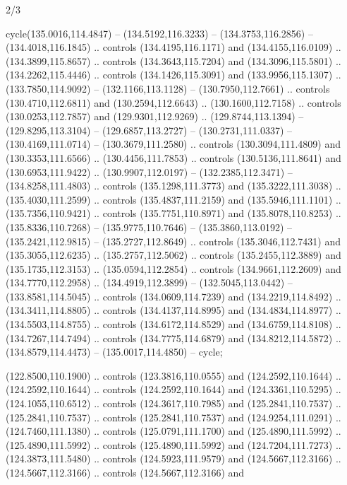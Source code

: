 \begin{flagdescription}{2/3}
\begin{scope}[scale=0.00214\flagwidth,yshift=164.5mm]
\begin{scope}[y=-0.8pt, x=0.8pt, inner sep=0pt, outer sep=0pt]
\begin{scope}[fill=black]
  cycle(135.0016,114.4847) -- (134.5192,116.3233) -- (134.3753,116.2856) --
  (134.4018,116.1845) .. controls (134.4195,116.1171) and (134.4155,116.0109) ..
  (134.3899,115.8657) .. controls (134.3643,115.7204) and (134.3096,115.5801) ..
  (134.2262,115.4446) .. controls (134.1426,115.3091) and (133.9956,115.1307) ..
  (133.7850,114.9092) -- (132.1166,113.1128) -- (130.7950,112.7661) .. controls
  (130.4710,112.6811) and (130.2594,112.6643) .. (130.1600,112.7158) .. controls
  (130.0253,112.7857) and (129.9301,112.9269) .. (129.8744,113.1394) --
  (129.8295,113.3104) -- (129.6857,113.2727) -- (130.2731,111.0337) --
  (130.4169,111.0714) -- (130.3679,111.2580) .. controls (130.3094,111.4809) and
  (130.3353,111.6566) .. (130.4456,111.7853) .. controls (130.5136,111.8641) and
  (130.6953,111.9422) .. (130.9907,112.0197) -- (132.2385,112.3471) --
  (134.8258,111.4803) .. controls (135.1298,111.3773) and (135.3222,111.3038) ..
  (135.4030,111.2599) .. controls (135.4837,111.2159) and (135.5946,111.1101) ..
  (135.7356,110.9421) .. controls (135.7751,110.8971) and (135.8078,110.8253) ..
  (135.8336,110.7268) -- (135.9775,110.7646) -- (135.3860,113.0192) --
  (135.2421,112.9815) -- (135.2727,112.8649) .. controls (135.3046,112.7431) and
  (135.3055,112.6235) .. (135.2757,112.5062) .. controls (135.2455,112.3889) and
  (135.1735,112.3153) .. (135.0594,112.2854) .. controls (134.9661,112.2609) and
  (134.7770,112.2958) .. (134.4919,112.3899) -- (132.5045,113.0442) --
  (133.8581,114.5045) .. controls (134.0609,114.7239) and (134.2219,114.8492) ..
  (134.3411,114.8805) .. controls (134.4137,114.8995) and (134.4834,114.8977) ..
  (134.5503,114.8755) .. controls (134.6172,114.8529) and (134.6759,114.8108) ..
  (134.7267,114.7494) .. controls (134.7775,114.6879) and (134.8212,114.5872) ..
  (134.8579,114.4473) -- (135.0017,114.4850) -- cycle;
\end{scope}
\begin{scope}[draw=black,fill=dark,line width=0.162pt]
 (122.8500,110.1900) .. controls (123.3816,110.0555) and
  (124.2592,110.1644) .. (124.2592,110.1644) .. controls (124.2592,110.1644) and
  (124.3361,110.5295) .. (124.1055,110.6512) .. controls (124.3617,110.7985) and
  (125.2841,110.7537) .. (125.2841,110.7537) .. controls (125.2841,110.7537) and
  (124.9254,111.0291) .. (124.7460,111.1380) .. controls (125.0791,111.1700) and
  (125.4890,111.5992) .. (125.4890,111.5992) .. controls (125.4890,111.5992) and
  (124.7204,111.7273) .. (124.3873,111.5480) .. controls (124.5923,111.9579) and
  (124.5667,112.3166) .. (124.5667,112.3166) .. controls (124.5667,112.3166) and

\end{scope}
\end{scope}
\end{scope}
\end{flagdescription}
